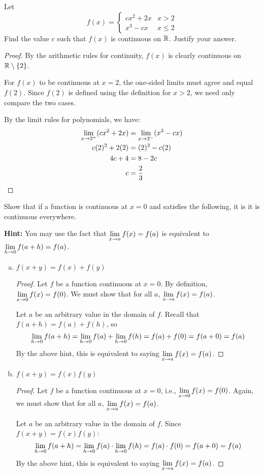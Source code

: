 \question Let
\begin{equation*}
  f(x) = \begin{cases}
    cx^2+2x & x > 2    \\
    x^3-cx  & x \leq 2
  \end{cases}
\end{equation*}
Find the value $c$ such that $f(x)$ is continuous on $\mathbb{R}$. Justify your answer.
\begin{proof}
  By the arithmetic rules for continuity, $f(x)$ is clearly continuous on $\mathbb{R} \setminus \{2\}$.

  For $f(x)$ to be continuous at $x=2$, the one-sided limits must agree and equal $f(2)$.
  Since $f(2)$ is defined using the definition for $x > 2$, we need only compare the two cases.

  By the limit rules for polynomials, we have:
  \begin{align*}
    \displaystyle\lim_{x\to2^+} (cx^2+2x) & = \displaystyle\lim_{x\to2^-}(x^3-cx) \\
    c(2)^2+2(2)             & = (2)^3-c(2)            \\
    4c+4                    & = 8-2c                  \\
    c                       & = \frac{2}{3} \qedhere
  \end{align*}
\end{proof}

\question Show that if a function is continuous at $x=0$ and satisfies the following, it is it is continuous everywhere.

\textbf{Hint:} You may use the fact that $\displaystyle\lim_{x\to a}f(x)=f(a)$ is equivalent to $\displaystyle\lim_{h\to0}f(a+h)=f(a)$.
\begin{enumerate}[(a)]
  \item $f(x+y)=f(x)+f(y)$
        \begin{proof}
          Let $f$ be a function continuous at $x=0$.
          By definition, $\displaystyle\lim_{x\to0}f(x)=f(0)$.
          We must show that for all $a$, $\displaystyle\lim_{x\to a} f(x) = f(a)$.

          Let $a$ be an arbitrary value in the domain of $f$.
          Recall that $f(a+h) = f(a)+f(h)$, so
          \[ \displaystyle\lim_{h\to0}f(a+h) = \displaystyle\lim_{h\to0}f(a) + \displaystyle\lim_{h\to0}f(h) = f(a) + f(0) = f(a+0) = f(a) \]
          By the above hint, this is equivalent to saying $\displaystyle\lim_{x\to a}f(x)=f(a)$.
        \end{proof}
  \item $f(x+y)=f(x)f(y)$
        \begin{proof}
          Let $f$ be a function continuous at $x=0$, i.e., $\displaystyle\lim_{x\to0}f(x)=f(0)$.
          Again, we must show that for all $a$, $\displaystyle\lim_{x\to a} f(x) = f(a)$.

          Let $a$ be an arbitrary value in the domain of $f$.
          Since $f(x+y)=f(x)f(y)$:
          \[ \displaystyle\lim_{h\to0} f(a+h) = \displaystyle\lim_{h\to0} f(a) \cdot \displaystyle\lim_{h\to0} f(h) = f(a) \cdot f(0) = f(a+0) = f(a) \]
          By the above hint, this is equivalent to saying $\displaystyle\lim_{x\to a}f(x)=f(a)$.
        \end{proof}
\end{enumerate}

